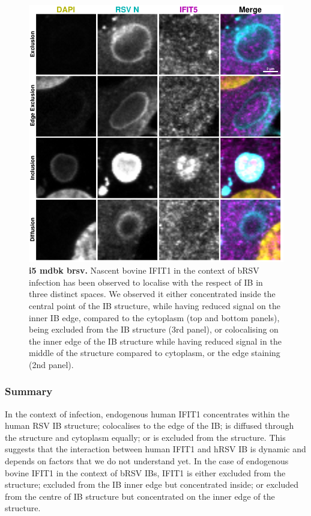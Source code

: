 \begin{figure}
    \centering
    \includegraphics[width=1\linewidth]{09. Chapter 4/Figs/02. Infection/03. IFIT5/09. mdbk i5.pdf}
    \caption[i5 mdbk brsv]{\textbf{i5 mdbk brsv.} Nascent bovine IFIT1 in the context of bRSV infection has been observed to localise with the respect of IB in three distinct spaces. We observed it either concentrated inside the central point of the IB structure, while having reduced signal on the inner IB edge, compared to the cytoplasm (top and bottom panels), being excluded from the IB structure (3rd panel), or colocalising on the inner edge of the IB structure while having reduced signal in the middle of the structure compared to cytoplasm, or the edge staining (2nd panel).}
    \label{fig:i5 mdbk brsv}
\end{figure}

\subsubsection{Summary} \label{Summary-infection}
In the context of infection, endogenous human IFIT1 concentrates within the human RSV IB structure; colocalises to the edge of the IB; is diffused through the structure and cytoplasm equally; or is excluded from the structure. This suggests that the interaction between human IFIT1 and hRSV IB is dynamic and depends on factors that we do not understand yet. In the case of endogenous bovine IFIT1 in the context of bRSV IBs, IFIT1 is either excluded from the structure; excluded from the IB inner edge but concentrated inside; or excluded from the centre of IB structure but concentrated on the inner edge of the structure. 

